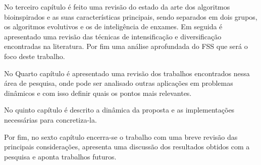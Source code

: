 No terceiro capítulo é feito uma revisão do estado da arte dos algoritmos bioinspirados e as suas características principais, sendo separados em dois grupos, os algoritmos evolutivos e os de inteligência de enxames. Em seguida é apresentado uma revisão das técnicas de intensificação e diversificação encontradas na literatura. Por fim uma análise aprofundada do FSS que será o foco deste trabalho.

No Quarto capítulo é apresentado uma revisão dos trabalhos encontrados nessa área de pesquisa, onde pode ser analisado outras aplicações em problemas dinâmicos e com isso definir quais os pontos mais relevantes.

No quinto capítulo é descrito a dinâmica da proposta e as implementações necessárias para concretiza-la.

Por fim, no sexto capítulo encerra-se o trabalho com uma breve revisão das principais considerações, apresenta uma discussão dos resultados obtidos com a pesquisa e aponta trabalhos futuros.